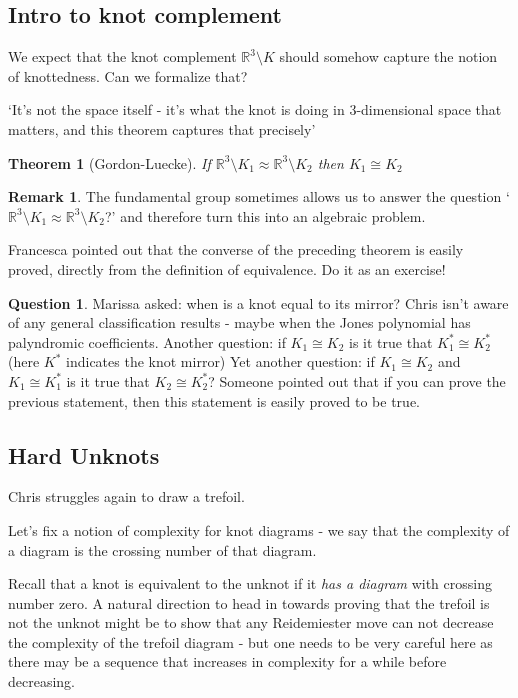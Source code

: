 \documentclass[11pt]{article}
\newcommand{\R}{\mathbb{R}}
\theoremstyle{plain}
\newtheorem{thm}{Theorem}
\theoremstyle{definition}
\newtheorem{remark}{Remark}
\newtheorem{question}{Question}
\begin{document}
\subsection{Intro to knot complement}

We expect that the knot complement $\R^3 \setminus K$ should somehow capture the notion of knottedness. Can we formalize that?

`It's not the space itself - it's what the knot is doing in 3-dimensional space that matters, and this theorem captures that precisely'


\begin{thm}[Gordon-Luecke]
  If $\R^3 \setminus K_1 \approx \R^3 \setminus K_2$ then $K_1 \cong K_2$
\end{thm}


\begin{remark}
  The fundamental group sometimes allows us to answer the question `$\R^3 \setminus K_1 \approx \R^3 \setminus K_2$?' and therefore turn this into an algebraic problem.

  Francesca pointed out that the converse of the preceding theorem is easily proved, directly from the definition of equivalence. Do it as an exercise!
\end{remark}

\begin{question}
  Marissa asked: when is a knot equal to its mirror? Chris isn't aware of any general classification results - maybe when the Jones polynomial has palyndromic coefficients.
  Another question: if $K_1 \cong K_2$ is it true that $K_1^\ast \cong K_2^\ast$ (here $K^\ast$ indicates the knot mirror)
  Yet another question: if $K_1 \cong K_2$ and $K_1 \cong K_1^\ast$ is it true that $K_2 \cong K_2^\ast$? Someone
  pointed out that if you can prove the previous statement, then this statement is easily proved to be true.
\end{question}

\subsection{Hard Unknots}

Chris struggles again to draw a trefoil.

Let's fix a notion of complexity for knot diagrams - we say that the complexity of a diagram is the crossing number of that diagram.

Recall that a knot is equivalent to the unknot if it \emph{has a diagram} with crossing number zero. A natural direction to head in towards proving that the trefoil is not the unknot might be to show that any Reidemiester move can
not decrease the complexity of the trefoil diagram - but one needs to be very careful here as there may be a sequence that increases in complexity for a while before decreasing.
\end{document}
